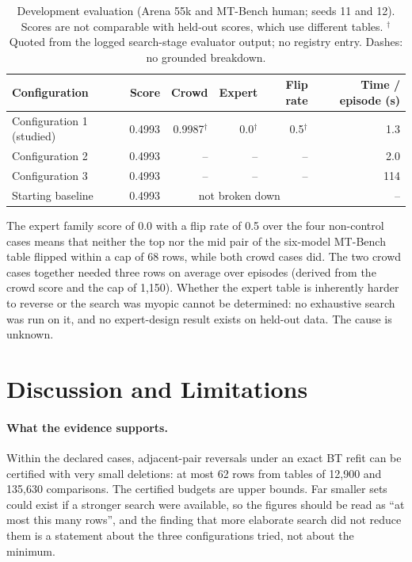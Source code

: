 \documentclass{article}
\begin{document}
\begin{table}[t]
\centering
\caption{Development evaluation (Arena 55k and MT-Bench human; seeds 11 and 12). Scores are not comparable with held-out scores, which use different tables. $^\dagger$Quoted from the logged search-stage evaluator output; no registry entry. Dashes: no grounded breakdown.}
\label{tab:dev}
\small
\begin{tabular}{lrrrrr}
\toprule
Configuration & Score & Crowd & Expert & Flip rate & Time / episode (s)\\
\midrule
Configuration 1 (studied) & 0.4993 & 0.9987$^\dagger$ & 0.0$^\dagger$ & 0.5$^\dagger$ & 1.3\\
Configuration 2 & 0.4993 & -- & -- & -- & 2.0\\
Configuration 3 & 0.4993 & -- & -- & -- & 114\\
\midrule
Starting baseline & 0.4993 & \multicolumn{3}{c}{not broken down} & --\\
\bottomrule
\end{tabular}
\end{table}

The expert family score of 0.0 with a flip rate of 0.5 over the four non-control cases means that neither the top nor the mid pair of the six-model MT-Bench table flipped within a cap of 68 rows, while both crowd cases did. The two crowd cases together needed three rows on average over episodes (derived from the crowd score and the cap of 1,150). %
Whether the expert table is inherently harder to reverse or the search was myopic cannot be determined: no exhaustive search was run on it, and no expert-design result exists on held-out data. The cause is unknown.

\section{Discussion and Limitations}
\paragraph{What the evidence supports.} Within the declared cases, adjacent-pair reversals under an exact BT refit can be certified with very small deletions: at most 62 rows from tables of 12,900 and 135,630 comparisons. The certified budgets are upper bounds. Far smaller sets could exist if a stronger search were available, so the figures should be read as ``at most this many rows'', and the finding that more elaborate search did not reduce them is a statement about the three configurations tried, not about the minimum.
\end{document}
